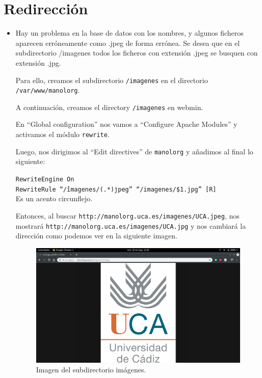\documentclass[12pt,letterpaper]{article}
\begin{document}
\section{Redirección}
\begin{itemize}
	\item Hay un problema en la base de datos con los nombres, y algunos ficheros aparecen erróneamente como .jpeg de forma errónea. Se desea que en el subdirectorio /imagenes todos los
	ficheros con extensión .jpeg se busquen con extensión .jpg.
	
	Para ello, creamos el subdirectorio \texttt{/imagenes} en el directorio \texttt{/var/www/manolorg}.
	
	A continuación, creamos el directory \texttt{/imagenes} en webmin.
	
	En ``Global configuration'' nos vamos a ``Configure Apache Modules'' y activamos el módulo \texttt{rewrite}.
	
	Luego, nos dirigimos al ``Edit directives'' de \texttt{manolorg} y añadimos al final lo siguiente:
	\begin{center}
		\texttt{RewriteEngine On\\
			RewriteRule ``\^/imagenes/(.*)\.jpeg'' ``/imagenes/\$1.jpg'' [R]}
		\\Es un acento circunflejo.
	\end{center}

	Entonces, al buscar \texttt{http://manolorg.uca.es/imagenes/UCA.jpeg}, nos mostrará \texttt{http://manolorg.uca.es/imagenes/UCA.jpg} y nos cambiará la dirección como podemos ver en la siguiente imagen.
	\newpage
	\begin{figure}[h]
		\centering
		\includegraphics[scale=0.34]{Imagen.png}
		\caption{Imagen del subdirectorio imágenes.}
		\label{Imagen}
	\end{figure}
	

\end{itemize}
\end{document}
